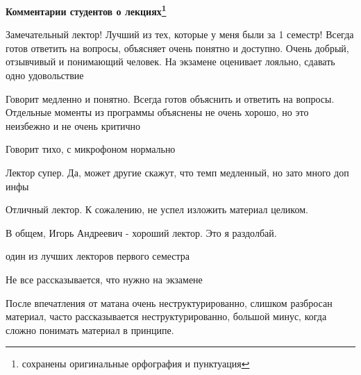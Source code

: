 		\textbf{Комментарии студентов о лекциях\protect\footnote{сохранены оригинальные орфография и пунктуация}}    
            \begin{commentbox} 
                Замечательный лектор! Лучший из тех, которые у меня были за 1 семестр! Всегда готов ответить на вопросы, объясняет очень понятно и доступно. Очень добрый, отзывчивый и понимающий человек. На экзамене оценивает лояльно, сдавать одно удовольствие 
            \end{commentbox} 
        
            \begin{commentbox} 
                Говорит медленно и понятно. Всегда готов объяснить и ответить на вопросы. Отдельные моменты из программы объяснены не очень хорошо, но это неизбежно и не очень критично 
            \end{commentbox} 
        
            \begin{commentbox} 
                Говорит тихо, с микрофоном нормально  
            \end{commentbox} 
        
            \begin{commentbox} 
                Лектор супер. Да, может другие скажут, что темп медленный, но зато много доп инфы 
            \end{commentbox} 
        
            \begin{commentbox} 
                Отличный лектор. К сожалению, не успел изложить материал целиком. 
            \end{commentbox} 
        
            \begin{commentbox} 
                В общем, Игорь Андреевич - хороший лектор. Это я раздолбай. 
            \end{commentbox} 
        
            \begin{commentbox} 
                один из лучших лекторов первого семестра 
            \end{commentbox} 
        
            \begin{commentbox} 
                Не все рассказывается, что нужно на экзамене  
            \end{commentbox}  
        
            \begin{commentbox} 
                После впечатления от матана очень неструктурированно, слишком разбросан материал, часто рассказывается неструктурированно, большой минус, когда сложно понимать материал в принципе. 
            \end{commentbox} 
        
